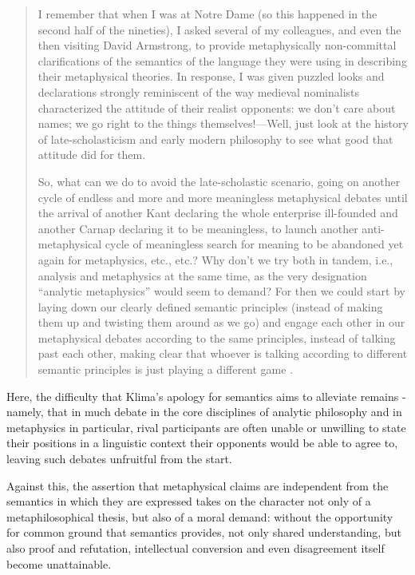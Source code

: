 \documentclass[]{article}
\begin{document}
\begin{quote}
I remember that when I was at Notre Dame (so this happened in the second
half of the nineties), I asked several of my colleagues, and even the then
visiting David Armstrong, to provide metaphysically non-committal
clarifications of the semantics of the language they were using in
describing their metaphysical theories. In response, I was given puzzled
looks and declarations strongly reminiscent of the way medieval
nominalists characterized the attitude of their realist opponents: we don’t
care about names; we go right to the things themselves!—Well, just look 
at the history of late-scholasticism and early modern philosophy to see
what good that attitude did for them.

So, what can we do to avoid the late-scholastic scenario, going on another
cycle of endless and more and more meaningless metaphysical debates
until the arrival of another Kant declaring the whole enterprise ill-founded
and another Carnap declaring it to be meaningless, to launch another anti-
metaphysical cycle of meaningless search for meaning to be abandoned
yet again for metaphysics, etc., etc.? Why don’t we try both in tandem,
i.e., analysis and metaphysics at the same time, as the very designation
“analytic metaphysics” would seem to demand? For then we could start by
laying down our clearly defined semantic principles (instead of making
them up and twisting them around as we go) and engage each other in our
metaphysical debates according to the same principles, instead of talking
past each other, making clear that whoever is talking according to different
semantic principles is just playing a different game \autocite[86-87]{Klima2014}.
\end{quote}

Here, the difficulty that Klima's apology for semantics aims to alleviate remains - 
namely, that in much debate in the core disciplines of analytic philosophy  
and in metaphysics in particular, 
rival participants are often unable or unwilling to state their positions in a linguistic context their opponents would be able to agree to, 
leaving such debates unfruitful from the start. 

Against this, the assertion that metaphysical claims are independent from the semantics in which they are expressed takes on the character not only of a metaphilosophical thesis, 
but also of a moral demand: 
without the opportunity for common ground that semantics provides, 
not only shared understanding, 
but also proof and refutation, 
intellectual conversion and even disagreement itself become unattainable.
\end{document}
